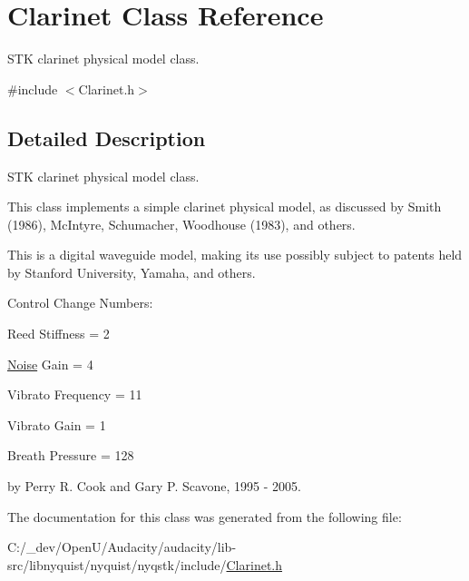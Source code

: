 \hypertarget{class_clarinet}{}\section{Clarinet Class Reference}
\label{class_clarinet}


S\+TK clarinet physical model class.  




{\ttfamily \#include $<$Clarinet.\+h$>$}



\subsection{Detailed Description}
S\+TK clarinet physical model class. 

This class implements a simple clarinet physical model, as discussed by Smith (1986), Mc\+Intyre, Schumacher, Woodhouse (1983), and others.

This is a digital waveguide model, making its use possibly subject to patents held by Stanford University, Yamaha, and others.

Control Change Numbers\+:
\begin{DoxyItemize}
\item Reed Stiffness = 2
\item \hyperlink{class_noise}{Noise} Gain = 4
\item Vibrato Frequency = 11
\item Vibrato Gain = 1
\item Breath Pressure = 128
\end{DoxyItemize}

by Perry R. Cook and Gary P. Scavone, 1995 -\/ 2005. 

The documentation for this class was generated from the following file\+:\begin{DoxyCompactItemize}
\item 
C\+:/\+\_\+dev/\+Open\+U/\+Audacity/audacity/lib-\/src/libnyquist/nyquist/nyqstk/include/\hyperlink{_clarinet_8h}{Clarinet.\+h}\end{DoxyCompactItemize}
